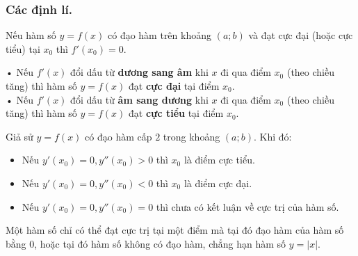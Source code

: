 \subsubsection{Các định lí.}
\begin{dl}
	Nếu hàm số $y=f(x)$ có đạo hàm trên khoảng $(a;b)$ và đạt cực đại (hoặc cực tiểu) tại $x_0$ thì $f'(x_0)=0$.
\end{dl}
\begin{dl}
\quad
\begin{center}
	\quad
\end{center}
• Nếu $f'(x)$ đổi dấu từ \textbf{dương sang âm} khi $x$ đi qua điểm $x_0$ (theo chiều tăng) thì hàm số $y=f(x)$ đạt \textbf{cực đại} tại điểm $x_0$.\\
• Nếu $f'(x)$ đổi dấu từ \textbf{âm sang dương} khi $x$ đi qua điểm $x_0$ (theo chiều tăng) thì hàm số $y=f(x)$ đạt \textbf{cực tiểu} tại điểm $x_0$.
\end{dl}
\begin{dl}
Giả sử $y=f(x)$ có đạo hàm cấp $2$ trong khoảng $(a; b)$. Khi đó:
\begin{itemize}
	\item Nếu $y'(x_0)=0, y''(x_0)>0$ thì $x_0$ là điểm cực tiểu.
	\item Nếu $y'(x_0)=0, y''(x_0)<0$ thì $x_0$ là điểm cực đại.
	\item Nếu $y'(x_0)=0, y''(x_0)=0$ thì chưa có kết luận về cực trị của hàm số.
\end{itemize}
\end{dl}
\begin{note}
Một hàm số chỉ có thể đạt cực trị tại một điểm mà tại đó đạo hàm của hàm số bằng $0$, hoặc tại đó hàm số không có đạo hàm, chẳng hạn hàm số $y=|x|$.
\end{note}

